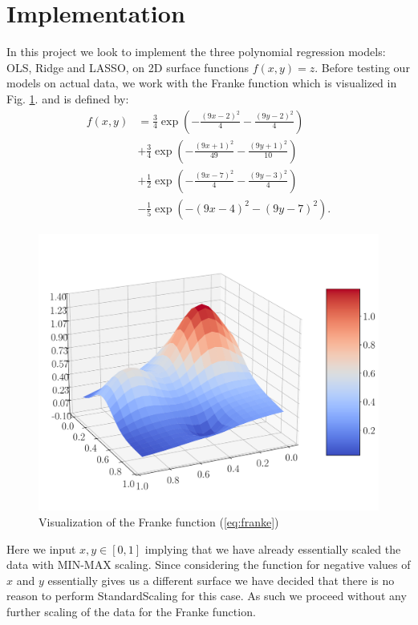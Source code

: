 \documentclass[%
reprint,
amsmath,amssymb,
aps,
pra,
]{revtex4-2}
\begin{document}
\section{Implementation}
In this project we look to implement the three polynomial regression models: OLS, Ridge and  LASSO, on 2D surface functions \(f(x,y)=z\). Before testing our models on actual data, we work with the Franke function which is visualized in Fig. \ref{fig:frankefunction}. and is defined by:
\begin{align}	\label{eq:franke}
	f(x,y)&=\frac{3}{4}\exp(-\frac{(9x-2)^2}{4}-\frac{(9y-2)^2}{4})\nonumber\\
	&+\frac{3}{4}\exp(-\frac{(9x+1)^2}{49}-\frac{(9y+1)^2}{10})\nonumber\\
	&+\frac{1}{2}\exp(-\frac{(9x-7)^2}{4}-\frac{(9y-3)^2}{4})\nonumber\\
	&-\frac{1}{5}\exp(-(9x-4)^2-(9y-7)^2).
\end{align}
\begin{figure}[H]
	\includegraphics[width=\linewidth]{Python/Figures/FrankeFunction.pdf}
	\caption{Visualization of the Franke function (\ref{eq:franke})}
	\label{fig:frankefunction}
\end{figure}
Here we input $x,y\in[0,1]$ implying that we have already essentially scaled the data with MIN-MAX scaling. Since considering the function for negative values of $x$ and $y$ essentially gives us a different surface we have decided that there is no reason to perform StandardScaling for this case. As such we proceed without any further scaling of the data for the Franke function. 
\end{document}

